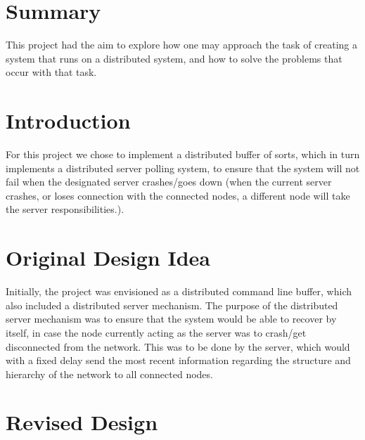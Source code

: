\documentclass[12pt]{article}
\begin{document}
\section{Summary} %
\label{sec:summary}
This project had the aim to explore how one may approach the task of creating a system that runs on a distributed system, and how to solve the problems that occur with that task.

\section{Introduction} %
\label{sec:introduction}
For this project we chose to implement a distributed buffer of sorts, which in turn implements a distributed server polling system, to ensure that the system will not fail when the designated server crashes/goes down (when the current server crashes, or loses connection with the connected nodes, a different node will take the server responsibilities.).

\section{Original Design Idea} %
\label{sec:original_design_idea}

Initially, the project was envisioned as a distributed command line buffer, which also included a distributed server mechanism. The purpose of the distributed server mechanism was to ensure that the system would be able to recover by itself, in case the node currently acting as the server was to crash/get disconnected from the network. This was to be done by the server, which would with a fixed delay send the most recent information regarding the structure and hierarchy of the network to all connected nodes.

\section{Revised Design} %
\label{sec:revised_design}
\end{document}
